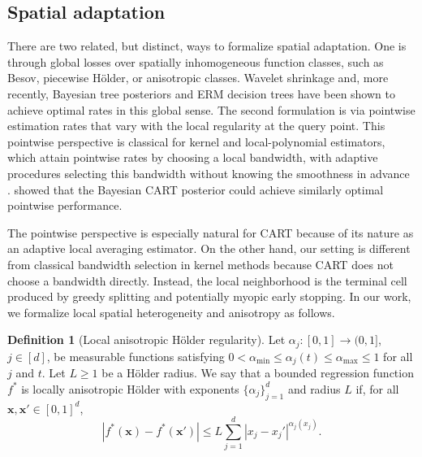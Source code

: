 \documentclass[11pt]{article}
\theoremstyle{plain}
\theoremstyle{definition}
\newtheorem{definition}[theorem]{Definition}
\theoremstyle{remark}
\theoremstyle{plain}
\newcommand{\bx}{\mathbf{x}}
\newcommand{\1}{\mathbbm{1}}
\begin{document}
\subsection{Spatial adaptation}

There are two related, but distinct, ways to formalize spatial adaptation. 
One is through global losses over spatially inhomogeneous function classes, such as Besov, piecewise H\"older, or anisotropic classes.
Wavelet shrinkage \citep{donoho1994ideal,donoho1995wavelet} and, more recently, Bayesian tree posteriors \citep{jeong2023art} and ERM decision trees \citep{xu2026statistical} have been shown to achieve optimal rates in this global sense.
The second formulation is via pointwise estimation rates that vary with the local regularity at the query point. 
This pointwise perspective is classical for kernel and local-polynomial estimators, which attain pointwise rates by choosing a local bandwidth, with adaptive procedures selecting this bandwidth without knowing the smoothness in advance \citep{hoffman2002random,lepski2015adaptive}. 
\citet{rovckova2024ideal} showed that the Bayesian CART posterior could achieve similarly optimal pointwise performance.

The pointwise perspective is especially natural for CART because of its nature as an adaptive local averaging estimator.
On the other hand, our setting is different from classical bandwidth selection in kernel methods because CART does not choose a bandwidth directly.
Instead, the local neighborhood is the terminal cell produced by greedy splitting and potentially myopic early stopping. 
In our work, we formalize local spatial heterogeneity and anisotropy as follows.

\begin{definition}[Local anisotropic H\"older regularity]
\label{def::localholder}
Let $\alpha_j:[0,1]\to(0,1]$, $j\in[d]$, be measurable functions satisfying
$0<\alpha_{\min}\le\alpha_j(t)\le\alpha_{\max}\le1$ for all $j$ and $t$.
Let $L\ge1$ be a H\"older radius.
We say that a bounded regression function $f^*$ is locally anisotropic H\"older with exponents $\{\alpha_j\}_{j=1}^d$ and radius $L$ if, for all $\bx,\bx'\in[0,1]^d$,
\[
|f^*(\bx)-f^*(\bx')|
\le
L\sum_{j=1}^d |x_j-x_j'|^{\alpha_j(x_j)}.
\]
\end{definition}
\end{document}
